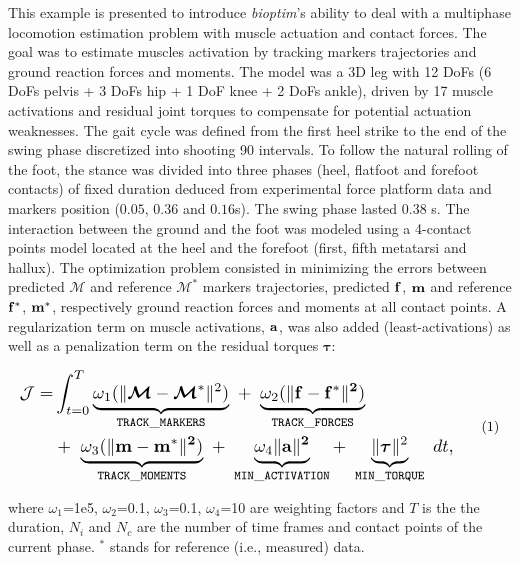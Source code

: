 This example is presented to introduce \textit{bioptim}'s ability to deal with a multiphase locomotion estimation problem with muscle actuation and contact forces.
The goal was to estimate muscles activation by tracking markers trajectories and ground reaction forces and moments. 
The model was a 3D leg with 12 DoFs (6 DoFs pelvis + 3 DoFs hip + 1 DoF knee + 2 DoFs ankle), driven by 17 muscle activations and residual joint torques to compensate for potential actuation weaknesses. 
The gait cycle was defined from the first heel strike to the end of the swing phase discretized into shooting 90 intervals. 
To follow the natural rolling of the foot, the stance was divided into three phases (heel, flatfoot and forefoot contacts) of fixed duration deduced from experimental force platform data and markers position ($0.05$, $0.36$ and $0.16$s).
The swing phase lasted 0.38 s. 
The interaction between the ground and the foot was modeled using a 4-contact points model located at the heel and the forefoot (first, fifth metatarsi and hallux).
The optimization problem consisted in minimizing the errors between predicted $\bm{\mathcal{M}}$ and reference $\bm{\mathcal{M}}^*$ markers trajectories, predicted $\bf{f}$, $\bf{m}$ and reference $\bf{f^*}$, $\bf{m^*}$, respectively ground reaction forces and moments at all contact points.
A regularization term on muscle activations, $\bf{a}$, was also added (least-activations) as well as a penalization term on the residual torques $\boldsymbol{\tau}$:

\[ 
\resizebox{0.9\columnwidth}{!}{$ 
\begin{aligned}
\mathcal{J} = &\int_{t=0}^{T}\underbrace{\omega_1(\|\bm{\mathcal{M}} - \bm{\mathcal{M}}^*\|^{2})}_{\mathtt{TRACK\_MARKERS}}~ 
+ ~ \underbrace{\omega_2(\|\bf{f} - \bf{f}^*\|^{2})}_{\mathtt{TRACK\_FORCES}}\\
&+ ~ \underbrace{\omega_3(\|\bf{m} - \bf{m}^*\|^{2})}_{\mathtt{TRACK\_MOMENTS}}~
+ ~ \underbrace{\omega_4\|\bf{a}\|^2}_{\mathtt{MIN\_ACTIVATION}}
+ ~ \underbrace{\|\boldsymbol{\tau}\|^2}_{\mathtt{MIN\_TORQUE}}~dt, 
\end{aligned}  
$}  
\addtag  
\label{eq:ocp_walk}  
\]

\noindent where $\omega_1$=1e5, $\omega_2$=0.1, $\omega_3$=0.1, $\omega_4$=10 are  weighting factors and $T$ is the the duration, $N_i$ and $N_c$ are the number of time frames and contact points of the current phase. $^*$ stands for reference (i.e., measured) data.\\

